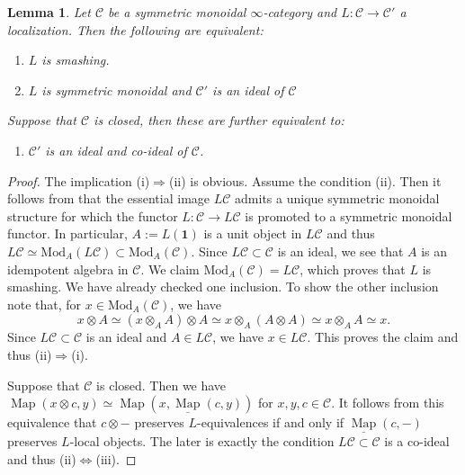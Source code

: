 \documentclass{amsart}
\theoremstyle{plain}
\newtheorem{lemma}[theorem]{Lemma}
\theoremstyle{definition}
\theoremstyle{remark}
\numberwithin{equation}{theorem}
\newcommand{\mcal}[1]{\mathcal{#1}}
\newcommand{\mbf}[1]{\mathbf{#1}}
\newcommand{\Mod}{\mathrm{Mod}}
\newcommand{\Map}{\operatorname{Map}}
\newcommand{\intMap}{\underline{\Map}}
\begin{document}
\begin{lemma}\label{lem:SmL}
Let $\mcal{C}$ be a symmetric monoidal $\infty$-category and $L\colon\mcal{C}\to\mcal{C}'$ a localization.
Then the following are equivalent:
\begin{enumerate}
\item $L$ is smashing.
\item $L$ is symmetric monoidal and $\mcal{C}'$ is an ideal of $\mcal{C}$
\end{enumerate}
Suppose that $\mcal{C}$ is closed, then these are further equivalent to:
\begin{enumerate}[resume]
\item $\mcal{C}'$ is an ideal and co-ideal of $\mcal{C}$.
\end{enumerate}
\end{lemma}
\begin{proof}
The implication (i)$\Rightarrow$(ii) is obvious.
Assume the condition (ii).
Then it follows from \cite[4.1.7.4]{HA} that the essential image $L\mcal{C}$ admits a unique symmetric monoidal structure for which the functor $L\colon\mcal{C}\to L\mcal{C}$ is promoted to a symmetric monoidal functor.
In particular, $A:=L(\mbf{1})$ is a unit object in $L\mcal{C}$ and thus $L\mcal{C}\simeq\Mod_A(L\mcal{C})\subset\Mod_A(\mcal{C})$.
Since $L\mcal{C}\subset\mcal{C}$ is an ideal, we see that $A$ is an idempotent algebra in $\mcal{C}$.
We claim $\Mod_A(\mcal{C})=L\mcal{C}$, which proves that $L$ is smashing.
We have already checked one inclusion.
To show the other inclusion note that, for $x\in\Mod_A(\mcal{C})$, we have
\[
	x\otimes A \simeq (x\otimes_AA)\otimes A \simeq x\otimes_A(A\otimes A) \simeq x\otimes_AA \simeq x.
\]
Since $L\mcal{C}\subset\mcal{C}$ is an ideal and $A\in L\mcal{C}$, we have $x\in L\mcal{C}$.
This proves the claim and thus (ii)$\Rightarrow$(i).

Suppose that $\mcal{C}$ is closed.
Then we have $\Map(x\otimes c,y)\simeq \Map(x,\intMap(c,y))$ for $x,y,c\in\mcal{C}$.
It follows from this equivalence that $c\otimes-$ preserves $L$-equivalences if and only if $\intMap(c,-)$ preserves $L$-local objects.
The later is exactly the condition $L\mcal{C}\subset\mcal{C}$ is a co-ideal and thus (ii)$\Leftrightarrow$(iii).
\end{proof}
\end{document}
